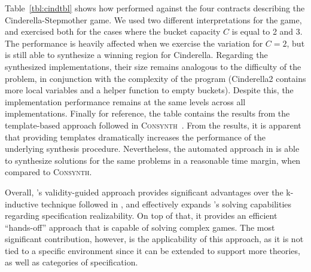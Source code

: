 Table~\ref{tbl:cindtbl} shows how \jsynvg performed against the four contracts describing the Cinderella-Stepmother game. We used two different interpretations for the game, and exercised both for the cases where the bucket capacity $C$ is equal to 2 and 3. The performance is heavily affected when we exercise the variation for $C=2$, but \jsynvg is still able to synthesize a winning region for Cinderella. Regarding the synthesized implementations, their size remains analogous to the difficulty of the problem, in conjunction with the complexity of the program (Cinderella2 contains more local variables and a helper function to empty buckets). Despite this, the implementation performance remains at the same levels across all implementations. Finally for reference, the table contains the results from the template-based approach followed in \textsc{Consynth}~\cite{beyene2014constraint}. From the results, it is apparent that providing templates dramatically increases the performance of the underlying synthesis procedure. Nevertheless, the automated approach in \jsynvg is able to synthesize solutions for the same problems in a reasonable time margin, when compared to \textsc{Consynth}.


Overall, \jsynvg's validity-guided approach provides significant advantages
over the k-inductive technique followed in \jsyn, and effectively expands
\jkind's solving capabilities regarding specification realizability. On top of that, it provides an efficient ``hands-off'' approach that is capable of solving complex games.
The most significant contribution, however, is the applicability of this approach, as it is not tied to a specific environment since it can be extended to support more
theories, as well as categories of specification.
